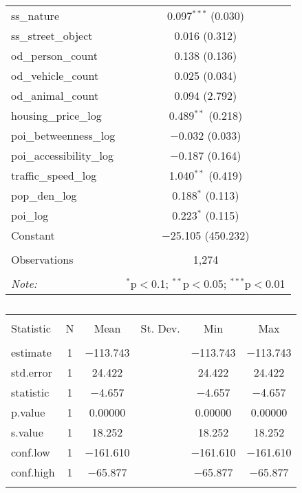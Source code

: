 \begin{table}[!htbp]
\begin{tabular}{@{\extracolsep{1pt}}lc}
  ss\_nature & 0.097$^{***}$ (0.030) \\ 
  ss\_street\_object & 0.016 (0.312) \\ 
  od\_person\_count & 0.138 (0.136) \\ 
  od\_vehicle\_count & 0.025 (0.034) \\ 
  od\_animal\_count & 0.094 (2.792) \\ 
  housing\_price\_log & 0.489$^{**}$ (0.218) \\ 
  poi\_betweenness\_log & $-$0.032 (0.033) \\ 
  poi\_accessibility\_log & $-$0.187 (0.164) \\ 
  traffic\_speed\_log & 1.040$^{**}$ (0.419) \\ 
  pop\_den\_log & 0.188$^{*}$ (0.113) \\ 
  poi\_log & 0.223$^{*}$ (0.115) \\ 
  Constant & $-$25.105 (450.232) \\ 
 \hline \\[-1.8ex] 
Observations & 1,274 \\ 
\hline 
\hline \\[-1.8ex] 
\textit{Note:}  & \multicolumn{1}{r}{$^{*}$p$<$0.1; $^{**}$p$<$0.05; $^{***}$p$<$0.01} \\ 
\end{tabular} 
\end{table} 

\begin{table}[!htbp] \centering 
  \caption{} 
  \label{} 
\small 
\begin{tabular}{@{\extracolsep{1pt}}lccccc} 
\\[-1.8ex]\hline 
\hline \\[-1.8ex] 
Statistic & \multicolumn{1}{c}{N} & \multicolumn{1}{c}{Mean} & \multicolumn{1}{c}{St. Dev.} & \multicolumn{1}{c}{Min} & \multicolumn{1}{c}{Max} \\ 
\hline \\[-1.8ex] 
estimate & 1 & $-$113.743 &  & $-$113.743 & $-$113.743 \\ 
std.error & 1 & 24.422 &  & 24.422 & 24.422 \\ 
statistic & 1 & $-$4.657 &  & $-$4.657 & $-$4.657 \\ 
p.value & 1 & 0.00000 &  & 0.00000 & 0.00000 \\ 
s.value & 1 & 18.252 &  & 18.252 & 18.252 \\ 
conf.low & 1 & $-$161.610 &  & $-$161.610 & $-$161.610 \\ 
conf.high & 1 & $-$65.877 &  & $-$65.877 & $-$65.877 \\ 
\hline \\[-1.8ex] 
\end{tabular} 
\end{table} 
